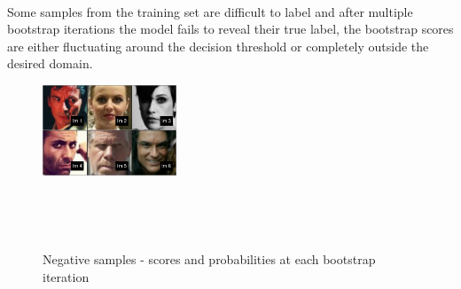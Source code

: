 \documentclass[a4paper]{article}
\begin{document}
        \paragraph{}
        Some samples from the training set are difficult to label and after multiple bootstrap iterations the model fails to reveal their true label, the bootstrap scores are either fluctuating around the decision threshold or completely outside the desired domain.
        \begin{figure}[H]
        \begin{minipage}{.3\textwidth}
        \vspace{-40pt}
        \includegraphics[width=4cm]{exp4/bs1_images_neg}
        \end{minipage}\hspace{-20pt}
        \begin{minipage}{.3\textwidth}
        \\
        \end{minipage}\hspace{30pt}
        \begin{minipage}{.3\textwidth}
        \\
        \end{minipage}
        \caption{Negative samples - scores and probabilities at each bootstrap iteration\label{bs2:neg}}
        \end{figure}
        
\end{document}
